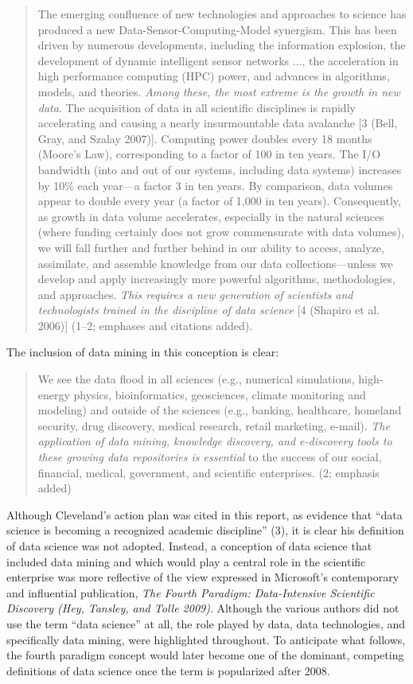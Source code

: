 \documentclass[
  letterpaper,
]{report}
\begin{document}
\begin{quote}
The emerging confluence of new technologies and approaches to science
has produced a new Data-Sensor-Computing-Model synergism. This has been
driven by numerous developments, including the information explosion,
the development of dynamic intelligent sensor networks ..., the
acceleration in high performance computing (HPC) power, and advances in
algorithms, models, and theories. \emph{Among these, the most extreme is
the growth in new data}. The acquisition of data in all scientific
disciplines is rapidly accelerating and causing a nearly insurmountable
data avalanche {[}3 (Bell, Gray, and Szalay 2007){]}. Computing power
doubles every 18 months (Moore's Law), corresponding to a factor of 100
in ten years. The I/O bandwidth (into and out of our systems, including
data systems) increases by 10\% each year---a factor 3 in ten years. By
comparison, data volumes appear to double every year (a factor of 1,000
in ten years). Consequently, as growth in data volume accelerates,
especially in the natural sciences (where funding certainly does not
grow commensurate with data volumes), we will fall further and further
behind in our ability to access, analyze, assimilate, and assemble
knowledge from our data collections---unless we develop and apply
increasingly more powerful algorithms, methodologies, and approaches.
\emph{This requires a new generation of scientists and technologists
trained in the discipline of data science} {[}4 (Shapiro et al. 2006){]}
(1--2; emphases and citations added).
\end{quote}

The inclusion of data mining in this conception is clear:

\begin{quote}
We see the data flood in all sciences (e.g., numerical simulations,
high-energy physics, bioinformatics, geosciences, climate monitoring and
modeling) and outside of the sciences (e.g., banking, healthcare,
homeland security, drug discovery, medical research, retail marketing,
e-mail). \emph{The application of data mining, knowledge discovery, and
e-discovery tools to these growing data repositories is essential} to
the success of our social, financial, medical, government, and
scientific enterprises. (2; emphasis added)
\end{quote}

Although Cleveland's action plan was cited in this report, as evidence
that ``data science is becoming a recognized academic discipline'' (3),
it is clear his definition of data science was not adopted. Instead, a
conception of data science that included data mining and which would
play a central role in the scientific enterprise was more reflective of
the view expressed in Microsoft's contemporary and influential
publication, \emph{The Fourth Paradigm: Data-Intensive Scientific
Discovery (Hey, Tansley, and Tolle 2009)}. Although the various authors
did not use the term ``data science'' at all, the role played by data,
data technologies, and specifically data mining, were highlighted
throughout. To anticipate what follows, the fourth paradigm concept
would later become one of the dominant, competing definitions of data
science once the term is popularized after 2008.
\end{document}
